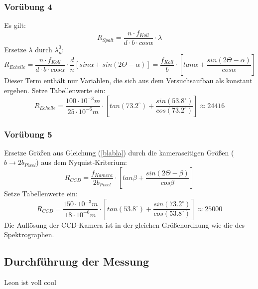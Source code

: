 \subsubsection{Vorübung 4}
Es gilt:
\begin{equation}
R_{Spalt} = \frac{n\cdot f_{Koll}}{d\cdot b\cdot cos \alpha}\cdot \lambda
\end{equation}
Ersetze $\lambda$ durch $\lambda_n^0$:
\begin{equation}
R_{Echelle} = \frac{n\cdot f_{Koll}}{d\cdot b\cdot cos \alpha}\cdot \frac{d}{n}[sin \alpha + sin(2\Theta-\alpha)] = \frac{f_{Koll}}{b}\cdot [tan \alpha + \frac{sin(2\Theta-\alpha)}{cos \alpha}]
\label{blabla}
\end{equation}
Dieser Term enthält nur Variablen, die sich aus dem Versuchsaufbau als konstant ergeben. 
Setze Tabellenwerte ein:
\begin{equation}
R_{Echelle} = \frac{100 \cdot 10^{-3}m}{25 \cdot 10^{-6}m}\cdot [tan (73.2^{\circ}) + \frac{sin(53.8^{\circ})}{cos (73.2^{\circ})}] \approx 24416
\end{equation}

\subsubsection{Vorübung 5}
Ersetze Größen aus Gleichung (\ref{blabla}) durch die kameraseitigen Größen ($b \rightarrow 2b_{Pixel}$) aus dem Nyquist-Kriterium:
\begin{equation}
R_{CCD} = \frac{f_{Kamera}}{2b_{Pixel}}\cdot [tan \beta + \frac{sin(2\Theta-\beta)}{cos \beta}]
\end{equation}
Setze Tabellenwerte ein:
\begin{equation}
R_{CCD} = \frac{150\cdot10^{-3}m}{18\cdot10^{-6}m}\cdot [tan (53.8^{\circ}) + \frac{sin(73.2^{\circ})}{cos (53.8^{\circ})}] \approx 25000
\end{equation}
Die Auflösung der CCD-Kamera ist in der gleichen Größenordnung wie die des Spektrographen. 



\subsection{Durchführung der Messung}
Leon ist voll cool

